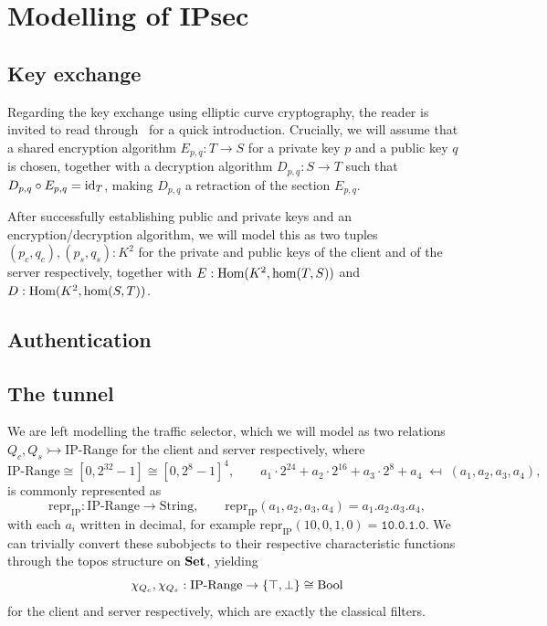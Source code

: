 \section{Modelling of IPsec}\label{sec:modelling}

\subsection{Key exchange}\label{sec:key-exchange}

Regarding the key exchange using elliptic curve cryptography, the reader is invited to read through~\cite{happelEllipticCurvesF42022} for a quick introduction.
Crucially, we will assume that a shared encryption algorithm $E_{p,q} : T \to S$ for a private key $p$ and a public key $q$ is chosen, together with a decryption algorithm $D_{p,q} : S \to T$ such that $D_{p,q} \circ E_{p,q} = \text{id}_T$, making $D_{p,q}$ a retraction of the section $E_{p,q}$.

After successfully establishing public and private keys and an encryption/decryption algorithm, we will model this as two tuples $(p_c, q_c), (p_s, q_s) : K^2$ for the private and public keys of the client and of the server respectively, together with $E : \text{Hom}(K^2, \hom(T, S))$ and $D : \text{Hom}(K^2, \hom(S, T))$.

\subsection{Authentication}\label{sec:authentication}


\subsection{The tunnel}\label{sec:tunnel}

We are left modelling the traffic selector, which we will model as two relations $Q_c, Q_s \rightarrowtail \mathrm{IP\text{-}Range}$ for the client and server respectively, where
\[
	\mathrm{IP\text{-}Range} \cong [0, 2^{32} - 1] \cong [0, 2^{8} - 1]^4,
	\qquad
	a_1 \cdot 2^{24} + a_2 \cdot 2^{16} + a_3 \cdot 2^{8} + a_4 \;\mapsfrom\; (a_1, a_2, a_3, a_4),
\]
is commonly represented as
\[
	\mathrm{repr}_{\mathrm{IP}} : \mathrm{IP\text{-}Range} \to \mathrm{String},
	\qquad
	\mathrm{repr}_{\mathrm{IP}}(a_1, a_2, a_3, a_4) = a_1 \texttt{.} a_2 \texttt{.} a_3 \texttt{.} a_4,
\]
with each $a_i$ written in decimal, for example $\mathrm{repr}_{\mathrm{IP}}(10, 0, 1, 0) = \texttt{10.0.1.0}$.
We can trivially convert these subobjects to their respective characteristic functions through the topos structure on $\mathbf{Set}$, yielding
\[
	\chi_{Q_c}, \chi_{Q_s} : \mathrm{IP\text{-}Range} \to \{\top, \bot\} \cong \text{Bool}
\]
for the client and server respectively, which are exactly the classical filters.

